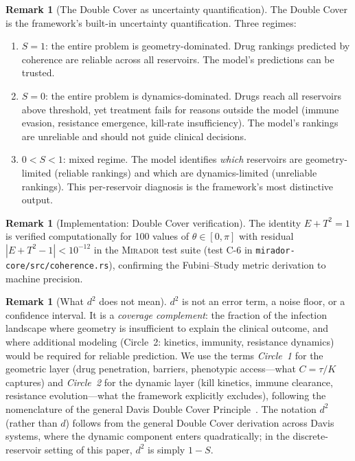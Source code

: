\documentclass[11pt]{article}
\theoremstyle{plain}
\theoremstyle{definition}
\newtheorem{remark}[theorem]{Remark}
\newcommand{\mirador}{\textsc{Mirador}}
\begin{document}
\begin{remark}[The Double Cover as uncertainty quantification]
\label{rem:dc-uq}
The Double Cover is the framework's built-in uncertainty
quantification. Three regimes:
\begin{enumerate}[label=(\roman*)]
  \item $S = 1$: the entire problem is geometry-dominated. Drug
    rankings predicted by coherence are reliable across all
    reservoirs. The model's predictions can be trusted.
  \item $S = 0$: the entire problem is dynamics-dominated. Drugs
    reach all reservoirs above threshold, yet treatment fails for
    reasons outside the model (immune evasion, resistance
    emergence, kill-rate insufficiency). The model's rankings are
    unreliable and should not guide clinical decisions.
  \item $0 < S < 1$: mixed regime. The model identifies
    \emph{which} reservoirs are geometry-limited (reliable
    rankings) and which are dynamics-limited (unreliable rankings).
    This per-reservoir diagnosis is the framework's most
    distinctive output.
\end{enumerate}
\end{remark}

\begin{remark}[Implementation: Double Cover verification]
\label{rem:implementation-dc}
The identity $E + T^2 = 1$ is verified computationally for 100
values of $\theta \in [0, \pi]$ with residual
$|E + T^2 - 1| < 10^{-12}$ in the \mirador{} test suite (test
C-6 in \texttt{mirador-core/src/coherence.rs}), confirming the
Fubini--Study metric derivation to machine precision.
\end{remark}

\begin{remark}[What $d^2$ does not mean]
\label{rem:d2-not}
$d^2$ is not an error term, a noise floor, or a confidence
interval. It is a \emph{coverage complement}: the fraction of the
infection landscape where geometry is insufficient to explain the
clinical outcome, and where additional modeling
(Circle~2: kinetics, immunity, resistance dynamics) would be
required for reliable prediction. We use the terms \emph{Circle~1}
for the geometric layer (drug penetration, barriers, phenotypic
access---what $C = \tau/K$ captures) and \emph{Circle~2} for the
dynamic layer (kill kinetics, immune clearance, resistance
evolution---what the framework explicitly excludes), following
the nomenclature of the general Davis Double Cover
Principle~\cite{DavisDoubleCover}.
The notation $d^2$ (rather than
$d$) follows from the general Double Cover derivation across Davis
systems, where the dynamic component enters quadratically; in the
discrete-reservoir setting of this paper, $d^2$ is simply
$1 - S$.
\end{remark}
\end{document}
